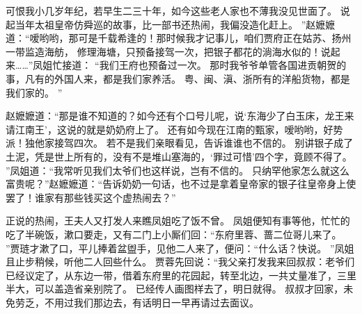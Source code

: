 可恨我小几岁年纪，若早生二三十年，如今这些老人家也不薄我没见世面了。
说起当年太祖皇帝仿舜巡的故事，比一部书还热闹，我偏没造化赶上。
”赵嬷嬷道：“嗳哟哟，那可是千载希逢的！那时候我才记事儿，咱们贾府正在姑苏、扬州一带监造海舫，
修理海塘，只预备接驾一次，把银子都花的淌海水似的！说起来……”凤姐忙接道： 
“我们王府也预备过一次。
那时我爷爷单管各国进贡朝贺的事，凡有的外国人来，都是我们家养活。
粤、闽、滇、浙所有的洋船货物，都是我们家的。
”\par
赵嬷嬷道：“那是谁不知道的？如今还有个口号儿呢，说‘东海少了白玉床，龙王来请江南王’，这说的就是奶奶府上了。
还有如今现在江南的甄家，嗳哟哟，好势派！独他家接驾四次。
若不是我们亲眼看见，告诉谁谁也不信的。
别讲银子成了土泥，凭是世上所有的，没有不是堆山塞海的，‘罪过可惜’四个字，竟顾不得了。
”凤姐道：“我常听见我们太爷们也这样说，岂有不信的。
只纳罕他家怎么就这么富贵呢？”赵嬷嬷道：“告诉奶奶一句话，也不过是拿着皇帝家的银子往皇帝身上使罢了！谁家有那些钱买这个虚热闹去？”\par
正说的热闹，王夫人又打发人来瞧凤姐吃了饭不曾。
凤姐便知有事等他，忙忙的吃了半碗饭，漱口要走，又有二门上小厮们回：“东府里蓉、蔷二位哥儿来了。
”贾琏才漱了口，平儿捧着盆盥手，见他二人来了，便问：“什么话？快说。
”凤姐且止步稍候，听他二人回些什么。
贾蓉先回说：“我父亲打发我来回叔叔：老爷们已经议定了，从东边一带，借着东府里的花园起，转至北边，一共丈量准了，三里半大，可以盖造省亲别院了。
已经传人画图样去了，明日就得。
叔叔才回家，未免劳乏，不用过我们那边去，有话明日一早再请过去面议。
